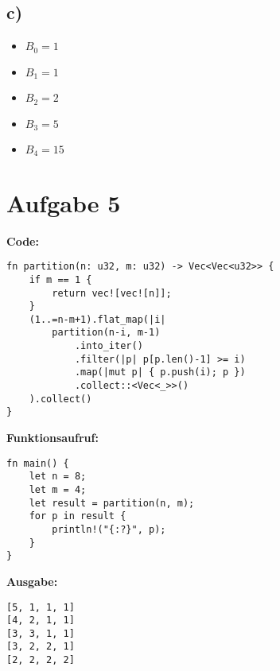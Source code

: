 \documentclass[a4paper]{scrartcl}
\begin{document}
\subsection*{c)}
\begin{itemize}
    \item $B_0 = 1$
    \item $B_1 = 1$
    \item $B_2 = 2$
    \item $B_3 = 5$
    \item $B_4 = 15$
\end{itemize}

\newpage
\section*{Aufgabe 5}
\textbf{Code:}
\begin{lstlisting}
fn partition(n: u32, m: u32) -> Vec<Vec<u32>> {
    if m == 1 {
        return vec![vec![n]];
    }
    (1..=n-m+1).flat_map(|i| 
        partition(n-i, m-1)
            .into_iter()
            .filter(|p| p[p.len()-1] >= i)
            .map(|mut p| { p.push(i); p })
            .collect::<Vec<_>>()
    ).collect()
}
\end{lstlisting}
\textbf{Funktionsaufruf:}
\begin{lstlisting}
fn main() {
    let n = 8;
    let m = 4;
    let result = partition(n, m);
    for p in result {
        println!("{:?}", p);
    }
}
\end{lstlisting}

\textbf{Ausgabe:}
\begin{lstlisting}
[5, 1, 1, 1]
[4, 2, 1, 1]
[3, 3, 1, 1]
[3, 2, 2, 1]
[2, 2, 2, 2]
\end{lstlisting}
\end{document}

